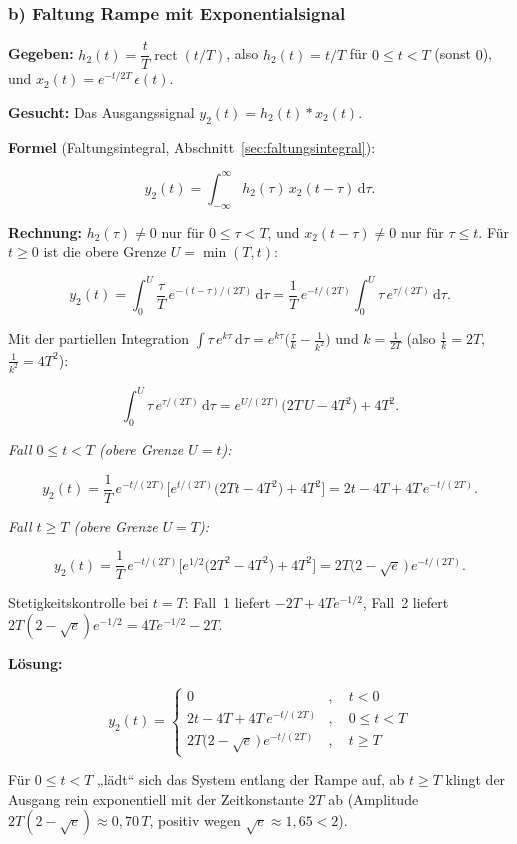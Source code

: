 \subsubsection*{b) Faltung Rampe mit Exponentialsignal}

\begin{beispiel}

\textbf{Gegeben:} $h_2(t) = \dfrac{t}{T}\operatorname{rect}(t/T)$, also
$h_2(t) = t/T$ für $0 \leq t < T$ (sonst $0$), und
$x_2(t) = e^{-t/2T}\,\epsilon(t)$.

\textbf{Gesucht:} Das Ausgangssignal $y_2(t) = h_2(t) * x_2(t)$.

\textbf{Formel} (Faltungsintegral, Abschnitt~\ref{sec:faltungsintegral}):

$$
y_2(t) = \int_{-\infty}^{\infty} h_2(\tau)\, x_2(t - \tau)\,\mathrm{d}\tau.
$$

\textbf{Rechnung:} $h_2(\tau) \neq 0$ nur für $0 \leq \tau < T$, und
$x_2(t - \tau) \neq 0$ nur für $\tau \leq t$. Für $t \geq 0$ ist die obere Grenze
$U = \min(T, t)$:

$$
y_2(t) = \int_{0}^{U} \frac{\tau}{T}\, e^{-(t - \tau)/(2T)}\,\mathrm{d}\tau
= \frac{1}{T}\, e^{-t/(2T)}\int_{0}^{U} \tau\, e^{\tau/(2T)}\,\mathrm{d}\tau.
$$

Mit der partiellen Integration
$\int \tau\, e^{k\tau}\,\mathrm{d}\tau = e^{k\tau}\big(\tfrac{\tau}{k} - \tfrac{1}{k^2}\big)$
und $k = \tfrac{1}{2T}$ (also $\tfrac{1}{k} = 2T$, $\tfrac{1}{k^2} = 4T^2$):

$$
\int_{0}^{U} \tau\, e^{\tau/(2T)}\,\mathrm{d}\tau
= e^{U/(2T)}\big(2T\,U - 4T^2\big) + 4T^2.
$$

\medskip
\textit{Fall $0 \leq t < T$ (obere Grenze $U = t$):}

$$
y_2(t) = \frac{1}{T}\, e^{-t/(2T)}\Big[e^{t/(2T)}\big(2Tt - 4T^2\big) + 4T^2\Big]
= 2t - 4T + 4T\, e^{-t/(2T)}.
$$

\medskip
\textit{Fall $t \geq T$ (obere Grenze $U = T$):}

$$
y_2(t) = \frac{1}{T}\, e^{-t/(2T)}\Big[e^{1/2}\big(2T^2 - 4T^2\big) + 4T^2\Big]
= 2T\big(2 - \sqrt{e}\,\big)\, e^{-t/(2T)}.
$$

Stetigkeitskontrolle bei $t = T$: Fall~1 liefert $-2T + 4T e^{-1/2}$, Fall~2
liefert $2T(2 - \sqrt{e})e^{-1/2} = 4T e^{-1/2} - 2T$. \checkmark

\textbf{Lösung:}

$$
\boxed{\;y_2(t) = \begin{cases}
0 & , \quad t < 0 \\[4pt]
2t - 4T + 4T\, e^{-t/(2T)} & , \quad 0 \leq t < T \\[4pt]
2T\big(2 - \sqrt{e}\,\big)\, e^{-t/(2T)} & , \quad t \geq T
\end{cases}\;}
$$

Für $0 \leq t < T$ „lädt`` sich das System entlang der Rampe auf, ab $t \geq T$
klingt der Ausgang rein exponentiell mit der Zeitkonstante $2T$ ab (Amplitude
$2T(2 - \sqrt{e}) \approx 0{,}70\,T$, positiv wegen $\sqrt{e} \approx 1{,}65 < 2$).

\end{beispiel}

